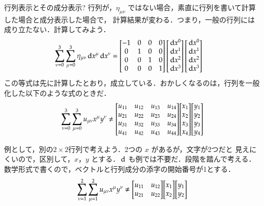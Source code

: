     \begin{memo}{行列表示とその成分表示?}
        行列が，$\eta_{\mu\nu}$ ではない場合，素直に行列を書いて計算した場合と成分表示した場合で，
        計算結果が変わる．つまり，一般の行列には成り立たない．計算してみよう．
        \begin{align*}
            \sum_{\nu=0}^{3} \sum_{\mu=0}^{3} \eta_{\mu\nu} \,\mathrm{d} x^{\mu} \,\mathrm{d} x^{\nu}
                    &= \begin{bmatrix}
                           -1 & 0 & 0 & 0 \\
                            0 & 1 & 0 & 0 \\
                            0 & 0 & 1 & 0 \\
                            0 & 0 & 0 & 1
                       \end{bmatrix}
                       \begin{bmatrix}
                           \,\mathrm{d} x^{0} \\
                           \,\mathrm{d} x^{1} \\
                           \,\mathrm{d} x^{2} \\
                           \,\mathrm{d} x^{3}
                       \end{bmatrix}
                       \begin{bmatrix}
                           \,\mathrm{d} x^{0} \\
                           \,\mathrm{d} x^{1} \\
                           \,\mathrm{d} x^{2} \\
                           \,\mathrm{d} x^{3}
                       \end{bmatrix}
        \end{align*}
        この等式は先に計算したとおり，成立している．おかしくなるのは，行列を一般化した以下のような式のときだ．
        \begin{align*}
            \sum_{\nu=0}^{3} \sum_{\mu=0}^{3} {u}_{\mu\nu} {x}^{\mu} {y}^{\nu}
                    \neq \mqty[ \xmat*{u}{4}{4} ]
                         \mqty[ \xmat*{x}{4}{1} ]
                         \mqty[ \xmat*{y}{4}{1} ]
        \end{align*}

        例として，別の$2 \times 2$行列で考えよう．2つの $x$ があるが，文字が2つだと
        見えにくいので，区別して，$x$，$y$ とする．$\,\mathrm{d}$ も例では不要だ．段階を踏んで考える．
        数学形式で書くので，ベクトルと行列成分の添字の開始番号が1とする．
        \begin{align*}
            \sum_{\nu=1}^{2} \sum_{\mu=1}^{2} {u}_{\mu\nu} {x}^{\mu} {y}^{\nu}
                    \neq \mqty[ \xmat*{u}{2}{2} ]
                         \mqty[ \xmat*{x}{2}{1} ]
                         \mqty[ \xmat*{y}{2}{1} ]
        \end{align*}


\end{memo}
